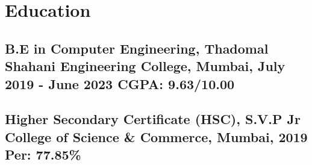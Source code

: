 \documentclass[a4,10pt]{article}
\newcommand{\subtext}[1]{
#1\par\vspace{-0.2cm}}
\newcommand{\hskills}[1]{
\textbf{\bfseries #1} }
\begin{document}



\section{Education }
\subsection*{B.E in Computer Engineering, {\normalsize \normalfont Thadomal Shahani Engineering College, Mumbai, July 2019 - June 2023} \hfill CGPA: 9.63/10.00} 
\vspace{0.1cm}
\subsection*{Higher Secondary Certificate (HSC), {\normalsize \normalfont S.V.P Jr College of Science \& Commerce, Mumbai, 2019} \hfill Per: 77.85\%} 
\vspace{0.1cm}
\end{document}

